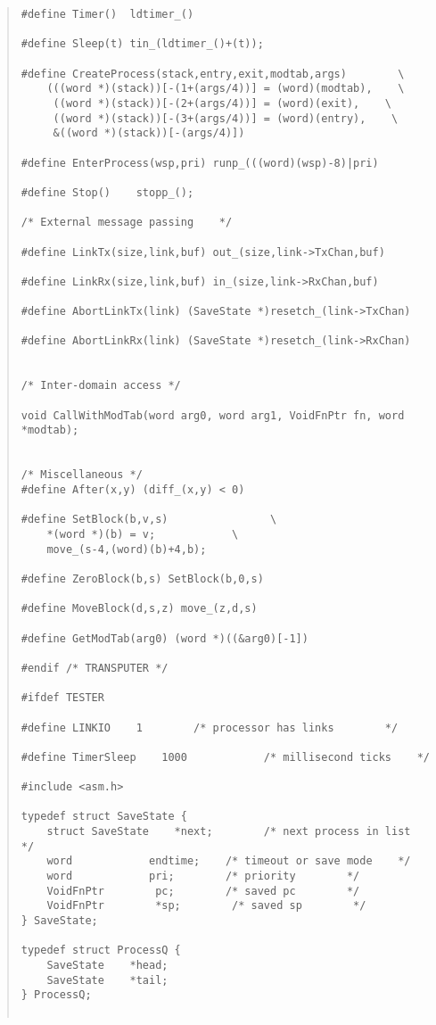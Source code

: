 \begin {quote}
\begin{verbatim}
#define Timer()  ldtimer_()

#define Sleep(t) tin_(ldtimer_()+(t));

#define CreateProcess(stack,entry,exit,modtab,args)        \
    (((word *)(stack))[-(1+(args/4))] = (word)(modtab),    \
     ((word *)(stack))[-(2+(args/4))] = (word)(exit),    \
     ((word *)(stack))[-(3+(args/4))] = (word)(entry),    \
     &((word *)(stack))[-(args/4)])        

#define EnterProcess(wsp,pri) runp_(((word)(wsp)-8)|pri)

#define Stop()    stopp_();

/* External message passing    */

#define LinkTx(size,link,buf) out_(size,link->TxChan,buf)

#define LinkRx(size,link,buf) in_(size,link->RxChan,buf)

#define AbortLinkTx(link) (SaveState *)resetch_(link->TxChan)

#define AbortLinkRx(link) (SaveState *)resetch_(link->RxChan)


/* Inter-domain access */

void CallWithModTab(word arg0, word arg1, VoidFnPtr fn, word *modtab);


/* Miscellaneous */
#define After(x,y) (diff_(x,y) < 0)

#define SetBlock(b,v,s)                \
    *(word *)(b) = v;            \
    move_(s-4,(word)(b)+4,b);

#define ZeroBlock(b,s) SetBlock(b,0,s)

#define MoveBlock(d,s,z) move_(z,d,s)

#define GetModTab(arg0) (word *)((&arg0)[-1])

#endif /* TRANSPUTER */

#ifdef TESTER

#define LINKIO    1        /* processor has links        */

#define TimerSleep    1000            /* millisecond ticks    */

#include <asm.h>

typedef struct SaveState {
    struct SaveState    *next;        /* next process in list    */
    word            endtime;    /* timeout or save mode    */
    word            pri;        /* priority        */
    VoidFnPtr        pc;        /* saved pc        */
    VoidFnPtr        *sp;        /* saved sp        */
} SaveState;

typedef struct ProcessQ {
    SaveState    *head;
    SaveState    *tail;
} ProcessQ;


\end{verbatim}
\end{quote}
